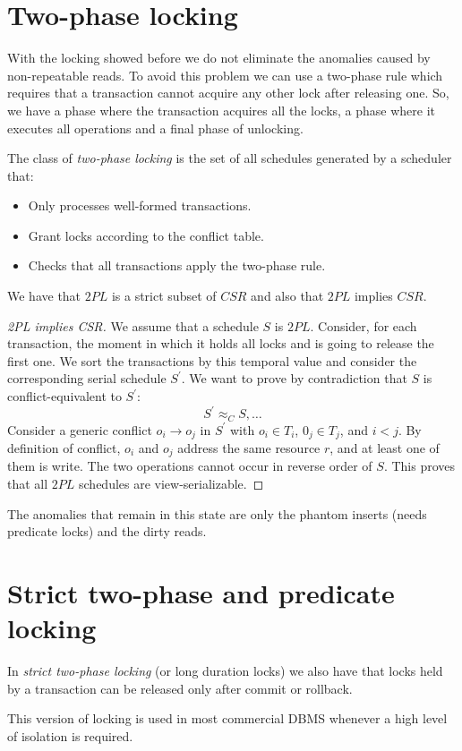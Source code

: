 \documentclass[12pt, a4paper]{report}
\begin{document}
    \section{Two-phase locking}
    With the locking showed before we do not eliminate the anomalies caused by non-repeatable reads. To avoid this problem we can use a two-phase rule which requires that a 
    transaction cannot acquire any other lock after releasing one. So, we have a phase where the transaction acquires all the locks, a phase where it executes all operations and 
    a final phase of unlocking. 
    \begin{definition}
        The class of \emph{two-phase locking} is the set of all schedules generated by a scheduler that: 
        \begin{itemize}
            \item Only processes well-formed transactions. 
            \item Grant locks according to the conflict table. 
            \item Checks that all transactions apply the two-phase rule.             
        \end{itemize}
    \end{definition}
    We have that $2PL$ is a strict subset of $CSR$ and also that $2PL$ implies $CSR$. 
    \begin{proof}[2PL implies CSR]
        We assume that a schedule $S$ is $2PL$. Consider, for each transaction, the moment in which it holds all locks and is going to release the first one. 
        We sort the transactions by this temporal value and consider the corresponding serial schedule $S^{'}$. We want to prove by contradiction that $S$ is conflict-equivalent to 
        $S^{'}$: 
        \[S^{'}\approx_CS,\dots\]
        Consider a generic conflict $o_i \rightarrow o_j$ in $S^{'}$ with $o_i \in T_i$, $0_j \in T_j$, and $i<j$. 
        By definition of conflict, $o_i$ and $o_j$ address the same resource $r$, and at least one of them is write. The two operations cannot occur in reverse order of $S$. 
        This proves that all $2PL$ schedules are view-serializable. 
    \end{proof}
    The anomalies that remain in this state are only the phantom inserts (needs predicate locks) and the dirty reads. 

    \section{Strict two-phase and predicate locking}
    \begin{definition}
        In \emph{strict two-phase locking} (or long duration locks) we also have that locks held by a transaction can be released only after commit or rollback.
    \end{definition}
    This version of locking is used in most commercial DBMS whenever a high level of isolation is required. 
\end{document}
